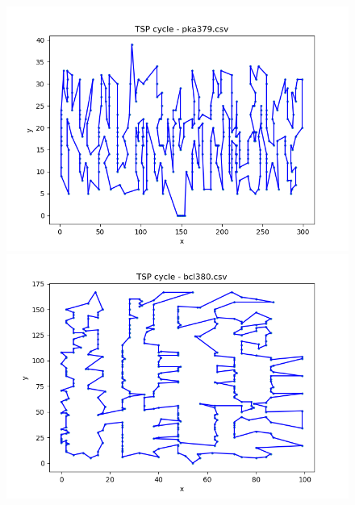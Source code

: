 \documentclass[12pt]{article}
\begin{document}
        \newpage

        \begin{figure}[h]
            \centering
            \includegraphics[width=0.8\linewidth]{img/pka379.png}
            \label{fig:pka379}
            \includegraphics[width=0.8\linewidth]{img/bcl380.png}
            \label{fig:bcl380}
        \end{figure}

        \newpage
\end{document}
